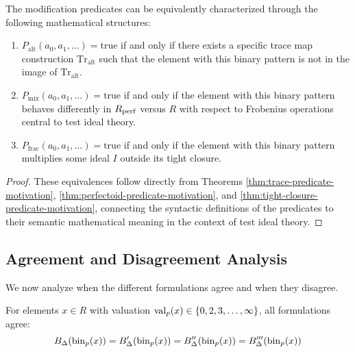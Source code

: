 \begin{corollary}\label{cor:predicate-equivalences}
The modification predicates can be equivalently characterized through the following mathematical structures:

\begin{enumerate}
    \item $P_{\text{alt}}(a_0, a_1, \ldots) = \text{true}$ if and only if there exists a specific trace map construction $\text{Tr}_{\text{alt}}$ such that the element with this binary pattern is not in the image of $\text{Tr}_{\text{alt}}$.
    
    \item $P_{\text{mix}}(a_0, a_1, \ldots) = \text{true}$ if and only if the element with this binary pattern behaves differently in $R_{\operatorname{perf}}$ versus $R$ with respect to Frobenius operations central to test ideal theory.
    
    \item $P_{\text{frac}}(a_0, a_1, \ldots) = \text{true}$ if and only if the element with this binary pattern multiplies some ideal $I$ outside its tight closure.
\end{enumerate}
\end{corollary}

\begin{proof}
These equivalences follow directly from Theorems \ref{thm:trace-predicate-motivation}, \ref{thm:perfectoid-predicate-motivation}, and \ref{thm:tight-closure-predicate-motivation}, connecting the syntactic definitions of the predicates to their semantic mathematical meaning in the context of test ideal theory.
\end{proof}

\subsection{Agreement and Disagreement Analysis}

We now analyze when the different formulations agree and when they disagree.

\begin{lemma}\label{lem:agreement-conditions}
For elements $x \in R$ with valuation $\operatorname{val}_p(x) \in \{0,2,3,\ldots,\infty\}$, all formulations agree:
$$B_\Delta(\operatorname{bin}_p(x)) = B'_\Delta(\operatorname{bin}_p(x)) = B''_\Delta(\operatorname{bin}_p(x)) = B'''_\Delta(\operatorname{bin}_p(x))$$
\end{lemma}

